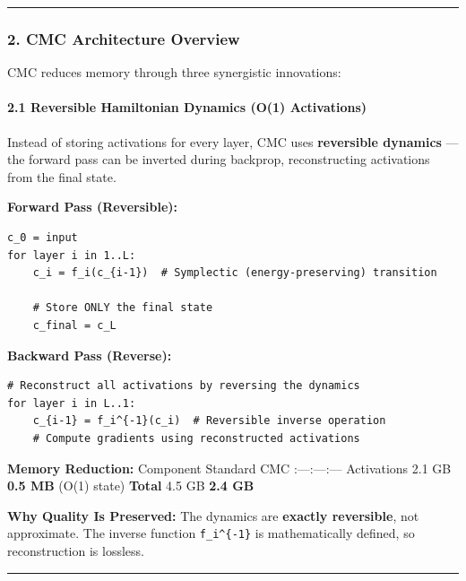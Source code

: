 \documentclass[
  11pt,
  a4paper,
]{article}
\begin{document}
\begin{center}\rule{0.5\linewidth}{0.5pt}\end{center}

\subsubsection{2. CMC Architecture
Overview}\label{cmc-architecture-overview}

CMC reduces memory through three synergistic innovations:

\paragraph{2.1 Reversible Hamiltonian Dynamics (O(1)
Activations)}\label{reversible-hamiltonian-dynamics-o1-activations}

Instead of storing activations for every layer, CMC uses
\textbf{reversible dynamics} --- the forward pass can be inverted during
backprop, reconstructing activations from the final state.

\textbf{Forward Pass (Reversible):}

\begin{verbatim}
c_0 = input
for layer i in 1..L:
    c_i = f_i(c_{i-1})  # Symplectic (energy-preserving) transition
    
    # Store ONLY the final state
    c_final = c_L
\end{verbatim}

\textbf{Backward Pass (Reverse):}

\begin{verbatim}
# Reconstruct all activations by reversing the dynamics
for layer i in L..1:
    c_{i-1} = f_i^{-1}(c_i)  # Reversible inverse operation
    # Compute gradients using reconstructed activations
\end{verbatim}

\textbf{Memory Reduction:} \textbar{} Component \textbar{} Standard
\textbar{} CMC \textbar{} \textbar:---\textbar:---\textbar:---\textbar{}
\textbar{} Activations \textbar{} 2.1 GB \textbar{} \textbf{0.5 MB}
(O(1) state) \textbar{} \textbar{} \textbf{Total} \textbar{} 4.5 GB
\textbar{} \textbf{2.4 GB} \textbar{}

\textbf{Why Quality Is Preserved:} The dynamics are \textbf{exactly
reversible}, not approximate. The inverse function
\texttt{f\_i\^{}\{-1\}} is mathematically defined, so reconstruction is
lossless.

\begin{center}\rule{0.5\linewidth}{0.5pt}\end{center}
\end{document}
